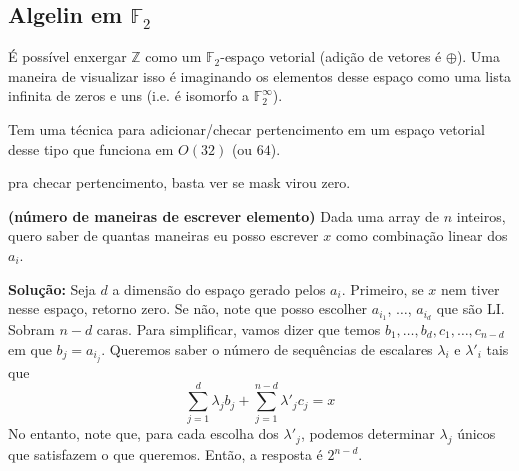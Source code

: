 \subsection{Algelin em $\mathbb{F}_2$}

É possível enxergar $\mathbb{Z}$ como um $\mathbb{F}_2$-espaço vetorial (adição de vetores é $\oplus$).
Uma maneira de visualizar isso é imaginando os elementos desse espaço
como uma lista infinita de zeros e uns (i.e. é isomorfo a $\mathbb{F}_2^\infty$).

Tem uma técnica para adicionar/checar pertencimento em um espaço vetorial desse tipo
que funciona em $O(32)$ (ou $64$).


pra checar pertencimento, basta ver se mask virou zero.

 \textbf{(número de maneiras de escrever elemento)} Dada uma array de $n$ inteiros, quero
saber de quantas maneiras eu posso escrever $x$ como combinação linear dos $a_i$.

\textbf{Solução:} Seja $d$ a dimensão do espaço gerado pelos $a_i$. Primeiro, se $x$ nem tiver
nesse espaço, retorno zero. Se não, note que posso escolher $a_{i_1}$, $\dots$, $a_{i_d}$ que são LI. 
Sobram $n-d$ caras. Para simplificar, vamos dizer que temos $b_1, \dots, b_d, c_1, \dots, c_{n-d}$ em que
$b_j = a_{i_j}$. Queremos saber o número de sequências de escalares $\lambda_i$ e $\lambda'_i$ tais que
$$ \sum\limits_{j=1}^d \lambda_j b_j + \sum\limits_{j=1}^{n-d} \lambda'_j c_j = x$$ 
No entanto, note que, para cada escolha dos $\lambda'_j$, podemos determinar $\lambda_j$ únicos que satisfazem
o que queremos. Então, a resposta é $2^{n-d}$.
